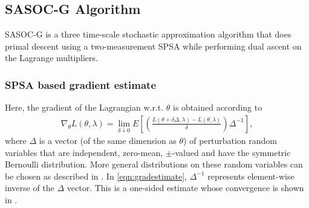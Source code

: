\documentclass[11pt,letterpaper,english]{article}
\begin{document}
\subsection{SASOC-G Algorithm}
\label{sec:sasoc-g}
SASOC-G is a three time-scale stochastic approximation algorithm that does primal descent using a two-measurement SPSA while performing dual ascent on the Lagrange multipliers. 

\subsubsection{SPSA based gradient estimate}
Here, the gradient of the Lagrangian w.r.t. $\theta$ is obtained according to
\begin{align}
\label{eqn:gradestimate}
 \nabla_\theta L(\theta,\lambda) = \lim_{\delta\downarrow 0} E\left[ \left(
\frac{L(\theta +\delta\Delta,\lambda) -
L(\theta,\lambda)}{\delta}\right) \Delta^{-1}\right], 
\end{align}
where $\Delta$ is a vector (of the same dimension as $\theta$)
of perturbation random variables that are independent, zero-mean, $\pm$-valued and have the symmetric Bernoulli distribution. More general distributions on these random variables can be chosen as described in \citep{spall92multivariate,spall2000adaptive}. In \eqref{eqn:gradestimate}, $\Delta^{-1}$ represents element-wise inverse of the $\Delta$ vector. This is a one-sided estimate whose convergence is shown in \citep[Lemma 1]{chen1999kiefer}.
\end{document}
